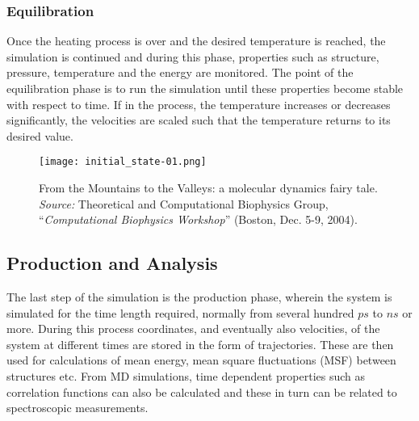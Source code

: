 \subsubsection{Equilibration}


Once the heating process is over and the desired temperature is reached, the simulation is continued and during this phase, properties such as structure, pressure, temperature and the energy are monitored. The point of the equilibration phase is to run the simulation until these properties become stable with respect to time. If in the process, the temperature increases or decreases significantly, the velocities are scaled such that the temperature returns to its desired value.

\begin{figure}[H]
\centering
\begin{minipage}[t]{0.8\textwidth}
	\centering
    \texttt{[image: initial\_state-01.png]}
    
    \footnotesize{\caption{From the Mountains to the Valleys: a molecular dynamics fairy tale.
    \textit{Source:} Theoretical and Computational Biophysics Group, ``\textit{Computational Biophysics Workshop}'' (Boston, Dec. 5-9, 2004).}
    \label{fig:symplettic-integrator}
    }
\end{minipage} 
\end{figure}

\subsection{Production and Analysis}

The last step of the simulation is the production phase, wherein the system is simulated for the time length required, normally from several hundred $ps$ to $ns$ or more. During this process coordinates,  and eventually also velocities, of the system at different times are stored in the form of trajectories.  These are then used for calculations of mean energy, mean square fluctuations (MSF) between structures etc. From MD simulations, time dependent properties such as correlation functions can also be calculated and these in turn can be related to spectroscopic measurements.

